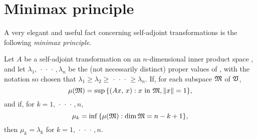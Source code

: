 \section{Minimax principle}

A very elegant and useful fact concerning self-adjoint transformations is the
following \emph{minimax principle}.

\begin{thmx}
    Let \(A\) be a self-adjoint transformation on an \(n\)-dimensional inner
    product space , and let \(\lambda_1, \,\cdot\,\cdot\,\cdot\,, \lambda_n\) be
    the (not necessarily distinct) proper values of \(\), with the notation so
    chosen that \(\lambda_1 \geq \lambda_2 \geq \,\cdot\,\cdot\,\cdot\, \geq
    \lambda_n\). If, for each subspace \(\mathfrak{M}\) of \(\mathfrak{V}\),
    \begin{equation*}
        \mu(\mathfrak{M}) = \sup\, \{\left(Ax,\,x\right) : x \text{ in } \mathfrak{M}, \left\lVert x\right\rVert = 1\},
    \end{equation*}
    and if, for \(k = 1, \,\cdot\,\cdot\,\cdot\,, n\),
    \begin{equation*}
        \mu_k = \inf\, \{\mu(\mathfrak{M}) : \dim \mathfrak{M} = n - k + 1\},
    \end{equation*}
    then \(\mu_k = \lambda_k\) for \(k = 1, \,\cdot\,\cdot\,\cdot\,, n\).
\end{thmx}

